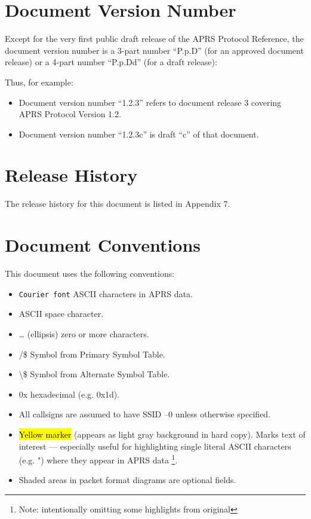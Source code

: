 \section*{Document Version Number}

Except for the very first public draft release of the APRS Protocol
Reference, the document version number is a 3-part number “P.p.D” (for
an approved document release) or a 4-part number “P.p.Dd” (for a draft
release):




Thus, for example:

\begin{itemize}

\item Document version number “1.2.3” refers to document release 3 covering
APRS Protocol Version 1.2.

\item Document version number “1.2.3c” is draft “c” of that document.

\end{itemize}


\section*{Release History}

The release history for this document is listed in Appendix 7.

\section*{Document Conventions}

This document uses the following conventions:
\begin{itemize}

\item \texttt {Courier font} ASCII characters in APRS data.

\item \textvisiblespace  ASCII space character.

\item … (ellipsis) zero or more characters.

\item /\$ Symbol from Primary Symbol Table.

\item \textbackslash\$ Symbol from Alternate Symbol Table.

\item 0x hexadecimal (e.g. 0x1d).

\item All callsigns are assumed to have SSID –0 unless otherwise specified.

\item \hl{Yellow marker} (appears as light gray background in hard
  copy).  Marks text of interest — especially useful for highlighting
  single literal ASCII characters (e.g. ") where they appear in APRS
  data \footnote{Note: intentionally omitting some highlights from
  original}.

\item Shaded areas in packet format diagrams are optional fields.

\end{itemize}

